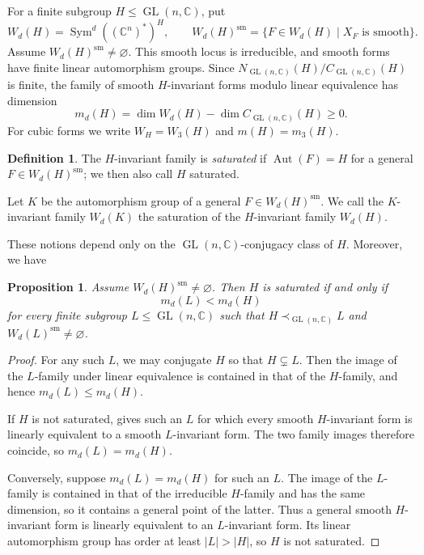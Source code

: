 \documentclass[12pt]{amsart}
\numberwithin{equation}{section}
\theoremstyle{plain}
\newtheorem{prop}[thm]{Proposition}
\theoremstyle{definition}
\newtheorem{defn}[thm]{Definition}
\theoremstyle{remark}
\newcommand{\CC}{\mathbb C}
\DeclareMathOperator{\Aut}{Aut}
\DeclareMathOperator{\GL}{GL}
\DeclareMathOperator{\Sym}{Sym}
\begin{document}
For a finite subgroup $H\leq\GL(n,\CC)$, put
\[
W_d(H)=\Sym^d((\CC^n)^*)^H,
\qquad
W_d(H)^{\mathrm{sm}}
=\{F\in W_d(H)\mid X_F\text{ is smooth}\}.
\]
Assume $W_d(H)^{\mathrm{sm}}\ne\varnothing$. This smooth locus is
irreducible, and smooth forms have finite linear automorphism groups.
Since $N_{\GL(n,\CC)}(H)/C_{\GL(n,\CC)}(H)$ is finite, the family of
smooth $H$-invariant forms modulo linear equivalence has dimension
\begin{equation}\label{eq:family-dimension}
m_d(H)=\dim W_d(H)-\dim C_{\GL(n,\CC)}(H)\geq 0.
\end{equation}
For cubic forms we write $W_H=W_3(H)$ and $m(H)=m_3(H)$.

\begin{defn}\label{def:linear-saturation}
The $H$-invariant family is \emph{saturated} if $\Aut(F)=H$ for a
general $F\in W_d(H)^{\mathrm{sm}}$; we then also call $H$ saturated.

Let $K$ be the automorphism group of a general $F\in W_d(H)^{\mathrm{sm}}$.
We call the $K$-invariant family $W_d(K)$ the saturation of the $H$-invariant family $W_d(H)$.
\end{defn}

These notions depend only on the $\GL(n,\CC)$-conjugacy class of $H$. Moreover, we have


\begin{prop}\label{prop:dimension-test}
Assume $W_d(H)^{\mathrm{sm}}\ne\varnothing$.  Then $H$ is saturated if and only if
\[
m_d(L)<m_d(H)
\]
for every finite subgroup $L\leq\GL(n,\CC)$ such that
$H\prec_{\GL(n,\CC)}L$ and
$W_d(L)^{\mathrm{sm}}\ne\varnothing$.
\end{prop}

\begin{proof}
For any such $L$, we may conjugate $H$ so that $H\subsetneq L$.
Then the image of the $L$-family under linear equivalence is contained
in that of the $H$-family, and hence $m_d(L)\leq m_d(H)$.

If $H$ is not saturated, \cite[Proposition~2.5]{FWZ26} gives such
an $L$ for which every smooth $H$-invariant form is linearly equivalent
to a smooth $L$-invariant form. The two family images therefore coincide,
so $m_d(L)=m_d(H)$.

Conversely, suppose $m_d(L)=m_d(H)$ for such an $L$.  The image of the
$L$-family is contained in that of the irreducible $H$-family and has the
same dimension, so it contains a general point of the latter.  Thus a
general smooth $H$-invariant form
is linearly equivalent to an $L$-invariant form. Its linear
automorphism group has order at least $|L|>|H|$, so $H$ is not
saturated.
\end{proof}
\end{document}

